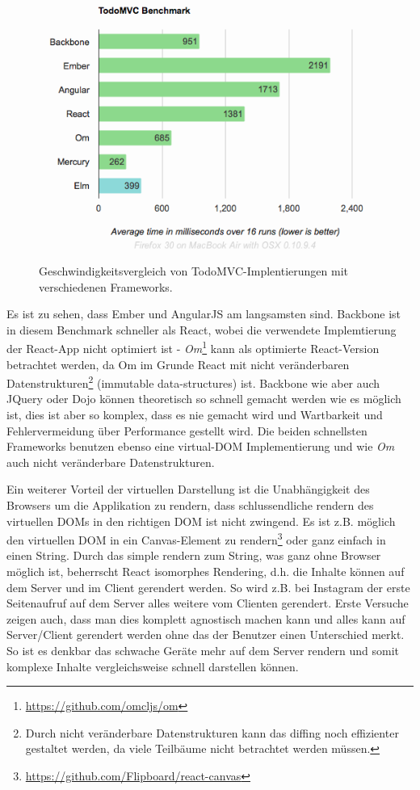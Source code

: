 \documentclass[12pt,twoside]{book}
\begin{document}
\begin{figure}[H]
    \centering
    \includegraphics[width=1.0\textwidth]{images/virtual_dom.png}
    \caption{Geschwindigkeitsvergleich von TodoMVC-Implentierungen mit verschiedenen Frameworks.}
    \label{fig:awesome_image}
\end{figure}

Es ist zu sehen, dass Ember und AngularJS am langsamsten sind. Backbone ist in diesem Benchmark schneller als React, wobei die verwendete Implemtierung der React-App nicht optimiert ist - \textit{Om}\footnote{\url{https://github.com/omcljs/om}} kann als optimierte React-Version betrachtet werden, da Om im Grunde React mit nicht veränderbaren Datenstrukturen\footnote{Durch nicht veränderbare Datenstrukturen kann das diffing noch effizienter gestaltet werden, da viele Teilbäume nicht betrachtet werden müssen.} (immutable data-structures) ist. Backbone wie aber auch JQuery oder Dojo können theoretisch so schnell gemacht werden wie es möglich ist, dies ist aber so komplex, dass es nie gemacht wird und Wartbarkeit und Fehlervermeidung über Performance gestellt wird.
Die beiden schnellsten Frameworks benutzen ebenso eine virtual-DOM Implementierung und wie \textit{Om} auch nicht veränderbare Datenstrukturen.


Ein weiterer Vorteil der virtuellen Darstellung ist die Unabhängigkeit des Browsers um die Applikation zu rendern, dass schlussendliche rendern des virtuellen DOMs in den richtigen DOM ist nicht zwingend. Es ist z.B. möglich den virtuellen DOM in ein Canvas-Element zu rendern\footnote{\url{https://github.com/Flipboard/react-canvas}} oder ganz einfach in einen String. Durch das simple rendern zum String, was ganz ohne Browser möglich ist, beherrscht React isomorphes Rendering, d.h. die Inhalte können auf dem Server und im Client gerendert werden. So wird z.B. bei Instagram der erste Seitenaufruf auf dem Server alles weitere vom Clienten gerendert. Erste Versuche zeigen auch, dass man dies komplett agnostisch machen kann und alles kann auf Server/Client gerendert werden ohne das der Benutzer einen Unterschied merkt. So ist es denkbar das schwache Geräte mehr auf dem Server rendern und somit komplexe Inhalte vergleichsweise schnell darstellen können.
\end{document}
